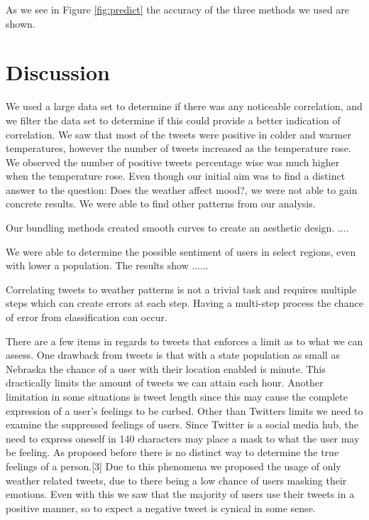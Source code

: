 \documentclass[journal]{vgtc}                %
\begin{document}
As we see in Figure \ref{fig:predict} the accuracy of the three methods we used are shown. 


\newpage


\section{Discussion}
We used a large data set to determine if there was any noticeable correlation, and we filter the data set to determine if this could provide a better indication of correlation. We saw that most of the tweets were positive in colder and warmer temperatures, however the number of tweets increased as the temperature rose. We observed the number of positive tweets percentage wise was much higher when the temperature rose. Even though our initial aim was to find a distinct answer to the question: Does the weather affect mood?, we were not able to gain concrete results. We were able to find other patterns from our analysis. 

Our bundling methods created smooth curves to create an aesthetic design. ....

We were able to determine the possible sentiment of users in select regions, even with lower a population. The results show ......

Correlating tweets to weather patterns is not a trivial task and requires multiple steps which can create errors at each step. Having a multi-step process the chance of error from classification can occur. 

There are a few items in regards to tweets that enforces a limit as to what we can assess. One drawback from tweets is that with a state population as small as Nebraska the chance of a user with their location enabled is minute. This dractically limits the amount of tweets we can attain each hour. Another limitation in some situations is tweet length since this may cause the complete expression of a user's feelings to be curbed. Other than Twitters limits we need to examine the suppressed feelings of users. Since Twitter is a social media hub, the need to express oneself in 140 characters may place a mask to what the user may be feeling. As proposed before there is no distinct way to determine the true feelings of a person.[3] Due to this phenomena we proposed the usage of only weather related tweets, due to there being a low chance of users masking their emotions. Even with this we saw that the majority of users use their tweets in a positive manner, so to expect a negative tweet is cynical in some sense.
\end{document}
